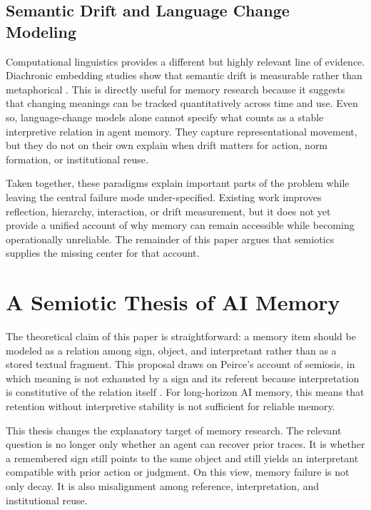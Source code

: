 \documentclass[10pt,twocolumn]{article}
\begin{document}
\subsection{Semantic Drift and Language Change Modeling}

Computational linguistics provides a different but highly relevant line of evidence. Diachronic embedding studies show that semantic drift is measurable rather than metaphorical \cite{hamilton2016diachronic}. This is directly useful for memory research because it suggests that changing meanings can be tracked quantitatively across time and use. Even so, language-change models alone cannot specify what counts as a stable interpretive relation in agent memory. They capture representational movement, but they do not on their own explain when drift matters for action, norm formation, or institutional reuse.

Taken together, these paradigms explain important parts of the problem while leaving the central failure mode under-specified. Existing work improves reflection, hierarchy, interaction, or drift measurement, but it does not yet provide a unified account of why memory can remain accessible while becoming operationally unreliable. The remainder of this paper argues that semiotics supplies the missing center for that account.

\section{A Semiotic Thesis of AI Memory}
\label{sec:semiotic-thesis}

The theoretical claim of this paper is straightforward: a memory item should be modeled as a relation among sign, object, and interpretant rather than as a stored textual fragment. This proposal draws on Peirce's account of semiosis, in which meaning is not exhausted by a sign and its referent because interpretation is constitutive of the relation itself \cite{short2021peirce}. For long-horizon AI memory, this means that retention without interpretive stability is not sufficient for reliable memory.

This thesis changes the explanatory target of memory research. The relevant question is no longer only whether an agent can recover prior traces. It is whether a remembered sign still points to the same object and still yields an interpretant compatible with prior action or judgment. On this view, memory failure is not only decay. It is also misalignment among reference, interpretation, and institutional reuse.
\end{document}
